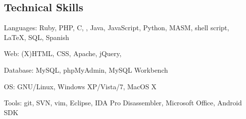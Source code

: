 \subsection*{Technical Skills}

\begin{indentsection}{\parindent}
\begin{description*}
	\item[Languages:]
	Ruby, PHP, C, \CPP, Java, JavaScript, Python, MASM, shell script, \LaTeX, 
	SQL, Spanish
	\item[Web:]
	(X)HTML, CSS, Apache, jQuery, 
	\item[Database:]
	MySQL, phpMyAdmin, MySQL Workbench
	\item[OS:]
	GNU/Linux, Windows XP/Vista/7, MacOS X
	\item[Tools:]
	git, SVN, vim, Eclipse, IDA Pro Disassembler, Microsoft Office, Android SDK
\end{description*}
\end{indentsection}
